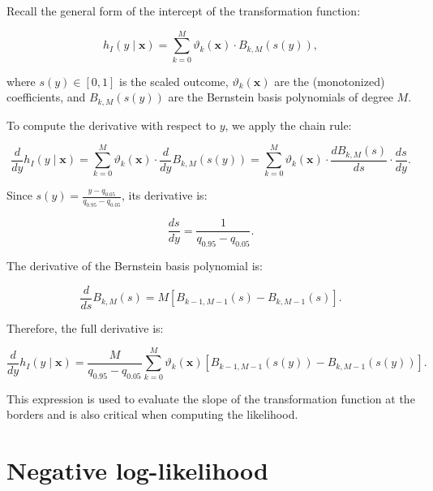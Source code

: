 Recall the general form of the intercept of the transformation function:

\begin{equation}
h_I(y \mid \mathbf{x}) = \sum_{k=0}^{M} \vartheta_k(\mathbf{x}) \cdot B_{k, M}(s(y)),
\end{equation}

where $s(y) \in [0, 1]$ is the scaled outcome, $\vartheta_k(\mathbf{x})$ are the (monotonized) coefficients, and $B_{k, M}(s(y))$ are the Bernstein basis polynomials of degree $M$.

To compute the derivative with respect to $y$, we apply the chain rule:

\begin{equation}
\frac{d}{dy} h_I(y \mid \mathbf{x}) = \sum_{k=0}^{M} \vartheta_k(\mathbf{x}) \cdot \frac{d}{dy} B_{k, M}(s(y)) = \sum_{k=0}^{M} \vartheta_k(\mathbf{x}) \cdot \frac{dB_{k, M}(s)}{ds} \cdot \frac{ds}{dy}.
\end{equation}


Since $s(y) = \frac{y - q_{0.05}}{q_{0.95} - q_{0.05}}$, its derivative is:

\begin{equation}
\frac{ds}{dy} = \frac{1}{q_{0.95} - q_{0.05}}.
\end{equation}

The derivative of the Bernstein basis polynomial is:

\begin{equation}
\frac{d}{ds} B_{k, M}(s) = M \left[ B_{k - 1, M - 1}(s) - B_{k, M - 1}(s) \right].
\end{equation}


Therefore, the full derivative is:

\begin{equation}
\frac{d}{dy} h_I(y \mid \mathbf{x}) = \frac{M}{q_{0.95} - q_{0.05}} \sum_{k=0}^{M} \vartheta_k(\mathbf{x}) \left[ B_{k - 1, M - 1}(s(y)) - B_{k, M - 1}(s(y)) \right].
\end{equation}

This expression is used to evaluate the slope of the transformation function at the borders and is also critical when computing the likelihood.





\section{Negative log-likelihood} \label{sec:nll}

